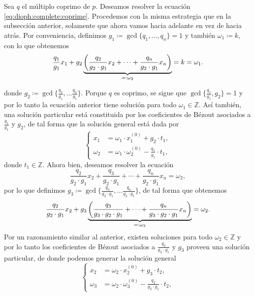 \documentclass[11pt]{article}
\begin{document}
Sea $q$ el múltiplo coprimo de $p$. Deseamos resolver la ecuación \ref{eq:dioph:complete:coprime}.
Procedemos con la misma estrategia que en la subsección anterior, solamente que ahora vamos hacia
adelante en vez de hacia atrás. Por conveniencia, definimos $g_1 \coloneq \gcd\lbrace q_1, \ldots,
q_n \rbrace = 1$ y también $\omega_1 \coloneq k$, con lo que obtenemos
\begin{equation*}
	\frac{q_1}{g_1}x_1 + g_2
	\underbrace{\left( \frac{q_2}{g_2 \cdot g_1}x_2 + \cdots + \frac{q_n}{g_2 \cdot
	g_1}x_n \right)}_{=\vcentcolon \omega_2} = k = \omega_1.
\end{equation*}

donde $g_2 \coloneq \gcd\lbrace \frac{q_2}{g_1}, \ldots \frac{q_n}{g_1}\rbrace$. Porque $q$ es
coprimo, se sigue que $\gcd\lbrace \frac{q_1}{g_1}, g_2\rbrace = 1$ y por lo tanto la ecuación
anterior tiene solución para todo $\omega_1 \in \mathbb{Z}$. Así también, una solución particular
está constituida por los coeficientes de Bézout asociados a $\frac{q_1}{g_1}$ y $g_2$, de tal forma que la
solución general está dada por
\begin{equation*}
	\begin{cases}
		x_1 &= \omega_1 \cdot x_1^{(0)} + g_2 \cdot t_1, \\
		\omega_2 &= \omega_1 \cdot \omega_2^{(0)} - \frac{q_1}{g_1} \cdot t_1,
	\end{cases}
\end{equation*}
donde $t_1 \in \mathbb{Z}$. Ahora bien, deseamos resolver la ecuación
\begin{equation*}
	\frac{q_2}{g_2 \cdot g_1}x_2 + \frac{q_3}{g_2 \cdot g_1} + \cdots + \frac{q_n}{g_2 \cdot g_1}x_n
	= \omega_2,
\end{equation*}
por lo que definimos $g_3 \coloneq \gcd\lbrace \frac{q_3}{g_2 \cdot g_1}, \ldots \frac{q_n}{g_2
\cdot g_1} \rbrace$, de tal forma que obtenemos
\begin{equation*}
	\frac{q_2}{g_2 \cdot g_1}x_2 + g_3 \underbrace{ \left( \frac{q_3}{g_3 \cdot g_2 \cdot g_1} + \cdots +
	\frac{q_n}{g_3 \cdot g_2 \cdot g_1}x_n \right)}_{=\vcentcolon \omega_3} = \omega_2.
\end{equation*}
Por un razonamiento similar al anterior, existen soluciones para todo $\omega_2 \in \mathbb{Z}$ y
por lo tanto los coeficientes de Bézout asociados a $\frac{q_2}{g_2 \cdot g_1}$ y $g_3$ proveen una
solución particular, de donde podemos generar la solución general
\begin{equation*}
	\begin{cases}
		x_2 &= \omega_2 \cdot x_2^{(0)} + g_3 \cdot t_2, \\
		\omega_3 &= \omega_2 \cdot \omega_3^{(0)} - \frac{q_2}{g_2 \cdot g_1} \cdot t_2,
	\end{cases}
\end{equation*}
\end{document}
